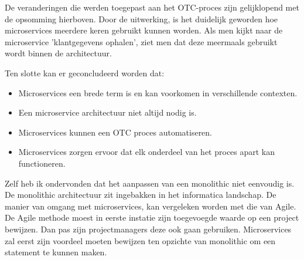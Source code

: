 De veranderingen die werden toegepast aan het OTC-proces zijn gelijklopend met de opsomming hierboven. 
Door de uitwerking, is het duidelijk geworden hoe microservices meerdere keren gebruikt kunnen worden. Als men kijkt naar de microservice 'klantgegevens ophalen', ziet men dat deze meermaals gebruikt wordt binnen de architectuur. 

Ten slotte kan er geconcludeerd worden dat:
\begin{itemize}
	\item Microservices een brede term is en kan voorkomen in verschillende contexten.
	\item Een microservice architectuur niet altijd nodig is.
	\item Microservices kunnen een OTC proces automatiseren.
	\item Microservices zorgen ervoor dat elk onderdeel van het proces apart kan functioneren.
\end{itemize}

Zelf heb ik ondervonden dat het aanpassen van een monolithic niet eenvoudig is. De monolithic architectuur zit ingebakken in het informatica landschap. De manier van omgang met microservices, kan vergeleken worden met die van Agile. De Agile methode moest in eerste instatie zijn toegevoegde waarde op een project bewijzen. Dan pas zijn projectmanagers deze ook gaan gebruiken. Microservices zal eerst zijn voordeel moeten bewijzen ten opzichte van monolithic om een statement te kunnen maken.



